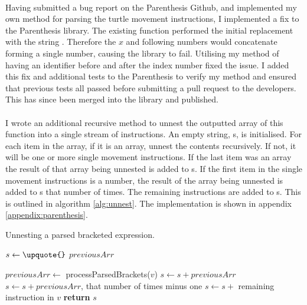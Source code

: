 \paragraph{} Having submitted a bug report on the Parenthesis Github, and implemented my own method for parsing the turtle movement instructions, I implemented a fix to the Parenthesis library. The existing function performed the initial replacement with the string . Therefore the $x$ and following numbers would concatenate forming a single number, causing the library to fail. Utilising my method of having an identifier before and after the index number fixed the issue. I added this fix and additional tests to the Parenthesis to verify my method and ensured that previous tests all passed before submitting a pull request to the developers. This has since been merged into the library and published.

\paragraph{} I wrote an additional recursive method to unnest the outputted array of this function into a single stream of instructions. An empty string, s, is initialised. For each item in the array, if it is an array, unnest the contents recursively. If not, it will be one or more single movement instructions. If the last item was an array the result of that array being unnested is added to s. If the first item in the single movement instructions is a number, the result of the array being unnested is added to s that number of times. The remaining instructions are added to s. This is outlined in algorithm \ref{alg:unnest}. The implementation is shown in appendix \ref{appendix:parenthesis}.

\begin{algorithm}[!htbp]
\caption{Unnesting a parsed bracketed expression.}
\label{alg:unnest}
\begin{algorithmic}[1]

   \State $s\gets \texttt{\upquote{}}$
   \State $previousArr$

     \State $previousArr \gets$ processParsedBrackets($v$)
    \Else
        \State $s \gets s + previousArr$
          \State $s \gets s + previousArr$, that number of times minus one
        \EndIf
       \EndIf
       \State $s \gets s + $ remaining instruction in $v$
    \EndIf
   \EndFor
   \State \textbf{return} $s$

\EndProcedure
\end{algorithmic}
\end{algorithm}

